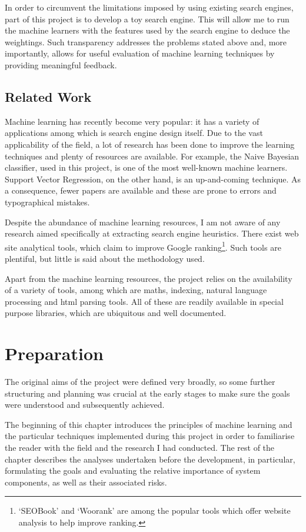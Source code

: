 \documentclass[12pt,notitlepage,twoside]{scrbook}
\begin{document}
In order to circumvent the limitations imposed by using existing search engines, part of
this project is to develop a toy search engine. This will allow me to run the machine
learners with the features used by the search engine to deduce the weightings. Such
transparency addresses the problems stated above and, more importantly, allows for useful
evaluation of machine learning techniques by providing meaningful feedback. 

\section{Related Work}
Machine learning has recently become very popular: it has a variety of applications among
which is search engine design itself. Due to the vast applicability of the field, a lot of
research has been done to improve the learning techniques and plenty of resources are
available. For example, the Naive Bayesian classifier, used in this project, is one of the
most well-known machine learners. Support Vector Regression, on the other hand, is an
up-and-coming technique. As a consequence, fewer papers are available and these are prone
to errors and typographical mistakes.

Despite the abundance of machine learning resources, I am not aware of any research
aimed specifically at extracting search engine heuristics. There exist web
site analytical tools, which claim to improve Google ranking\footnote{`SEOBook' and
	`Woorank' are among the popular tools which offer website analysis to help improve
ranking.}. Such tools are plentiful, but little is said about the methodology used. 

Apart from the machine learning resources, the project relies on the availability of a variety of
tools, among which are maths, indexing, natural language processing and html parsing tools. All of
these are readily available in special purpose libraries, which are ubiquitous and well
documented.

\chapter{Preparation}
The original aims of the project were defined very broadly, so some further structuring and
planning was crucial at the early stages to make sure the goals were understood and
subsequently achieved.

The beginning of this chapter introduces the principles of machine learning and the
particular techniques implemented during this project in order to familiarise the reader
with the field and the research I had conducted.  The rest of the chapter describes the
analyses undertaken before the development, in particular, formulating the goals and
evaluating the relative importance of system components, as well as their associated
risks. 
\end{document}
